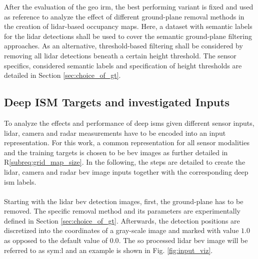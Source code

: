 After the evaluation of the geo \gls{irm}, the best performing variant is fixed and used as reference to analyze the effect of different ground-plane removal methods in the creation of lidar-based occupancy maps. Here, a dataset with semantic labels for the lidar detections shall be used to cover the semantic ground-plane filtering approaches. As an alternative, threshold-based filtering shall be considered by removing all lidar detections beneath a certain height threshold. The sensor specifics, considered semantic labels and specification of height thresholds are detailed in Section \ref{sec:choice_of_gt}. 
%
\subsection{Deep ISM Targets and investigated Inputs}
\label{subsec:def_of_targets_n_inputs}
To analyze the effects and performance of deep \gls{ism}s given different sensor inputs, lidar, camera and radar measurements have to be encoded into an input representation. For this work, a common representation for all sensor modalities and the training targets is chosen to be \gls{bev} images as further detailed in R\ref{subreq:grid_map_size}. In the following, the steps are detailed to create the lidar, camera and radar \gls{bev} image inputs together with the corresponding deep \gls{ism} labels. 
\\\\
Starting with the lidar \gls{bev} detection images, first, the ground-plane has to be removed. The specific removal method and its parameters are experimentally defined in Section \ref{sec:choice_of_gt}. Afterwards, the detection positions are discretized into the coordinates of a gray-scale image and marked with value $1.0$ as opposed to the default value of $0.0$. The so processed lidar \gls{bev} image will be referred to as \gls{sym:l} and an example is shown in Fig. \ref{fig:input_viz}.
\\\\
